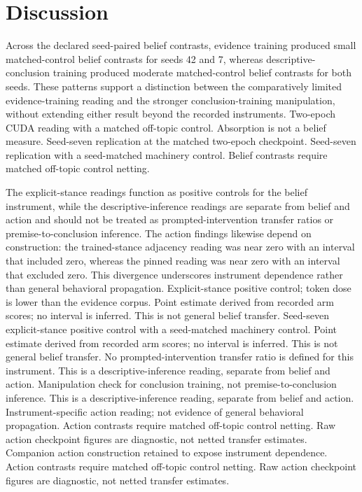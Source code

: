 \documentclass[10pt]{article}
\begin{document}
\section{ Discussion }
\label{sec:discussion}

Across the declared seed-paired belief contrasts, evidence training produced small matched-control belief contrasts for seeds 42 and 7, whereas descriptive-conclusion training produced moderate matched-control belief contrasts for both seeds. These patterns support a distinction between the comparatively limited evidence-training reading and the stronger conclusion-training manipulation, without extending either result beyond the recorded instruments. Two-epoch CUDA reading with a matched off-topic control. Absorption is not a belief measure. Seed-seven replication at the matched two-epoch checkpoint. Seed-seven replication with a seed-matched machinery control. Belief contrasts require matched off-topic control netting.



The explicit-stance readings function as positive controls for the belief instrument, while the descriptive-inference readings are separate from belief and action and should not be treated as prompted-intervention transfer ratios or premise-to-conclusion inference. The action findings likewise depend on construction: the trained-stance adjacency reading was near zero with an interval that included zero, whereas the pinned reading was near zero with an interval that excluded zero. This divergence underscores instrument dependence rather than general behavioral propagation. Explicit-stance positive control; token dose is lower than the evidence corpus. Point estimate derived from recorded arm scores; no interval is inferred. This is not general belief transfer. Seed-seven explicit-stance positive control with a seed-matched machinery control. Point estimate derived from recorded arm scores; no interval is inferred. This is not general belief transfer. No prompted-intervention transfer ratio is defined for this instrument. This is a descriptive-inference reading, separate from belief and action. Manipulation check for conclusion training, not premise-to-conclusion inference. This is a descriptive-inference reading, separate from belief and action. Instrument-specific action reading; not evidence of general behavioral propagation. Action contrasts require matched off-topic control netting. Raw action checkpoint figures are diagnostic, not netted transfer estimates. Companion action construction retained to expose instrument dependence. Action contrasts require matched off-topic control netting. Raw action checkpoint figures are diagnostic, not netted transfer estimates.
\end{document}

